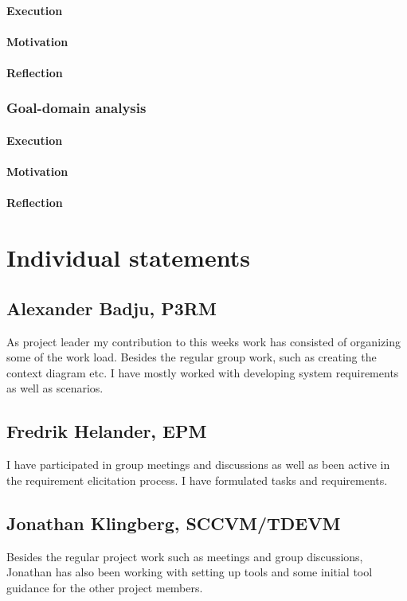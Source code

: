 \documentclass[10pt]{article}
\begin{document}
\paragraph{Execution}
\paragraph{Motivation}
\paragraph{Reflection}


\subsubsection{Goal-domain analysis}
\paragraph{Execution}
\paragraph{Motivation}
\paragraph{Reflection}

\section{Individual statements}
\noindent
\subsection{Alexander Badju, P3RM}
As project leader my contribution to this weeks work has consisted of organizing some of the work load. Besides the regular group work, such as creating the context diagram etc. I have mostly worked with developing system requirements as well as scenarios. 
\subsection{Fredrik Helander, EPM}
I have participated in group meetings and discussions as well as been active in the requirement elicitation process. I have formulated tasks and requirements.  
\subsection{Jonathan Klingberg, SCCVM/TDEVM}
Besides the regular project work such as meetings and group discussions, Jonathan has also been working with setting up tools and some initial tool guidance for the other project members.
\end{document}
